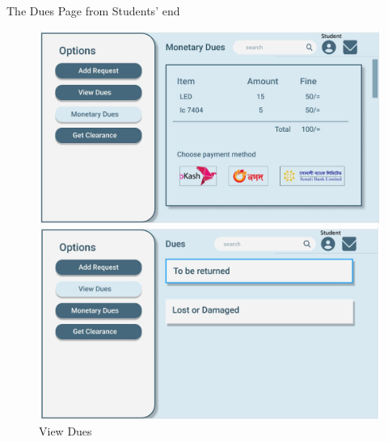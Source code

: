 \documentclass[20pt]{beamer}
\numberwithin{figure}{section}
\begin{document}
\begin{frame}{The Dues Page from Students' end}

    \begin{figure}

        \centering

        \begin{minipage}[b]{0.45\textwidth}
            \centering
            \includegraphics[width= \textwidth , height= 0.2\paperheight]{ViewDuesUI4.png}
            \caption{Monetary Dues}
            \label{fig:54}
        \end{minipage}
        \begin{minipage}[b]{0.45\textwidth}
            \centering
            \includegraphics[width= \textwidth , height= 0.2\paperheight]{ViewDuesUI.png}
            \caption{View Dues}
            \label{fig:55}

        \end{minipage}
        
    \end{figure}

    


\end{frame}
\end{document}
